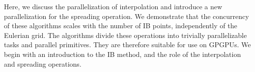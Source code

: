 Here, we discuss the parallelization of interpolation and introduce a new parallelization
for the spreading operation. We demonstrate that the concurrency of these algorithms
scales with the number of IB points, independently of the Eulerian grid. The algorithms
divide these operations into trivially parallelizable tasks and parallel primitives. They
are therefore suitable for use on GPGPUs. We begin with an introduction to the IB method,
and the role of the interpolation and spreading operations.

